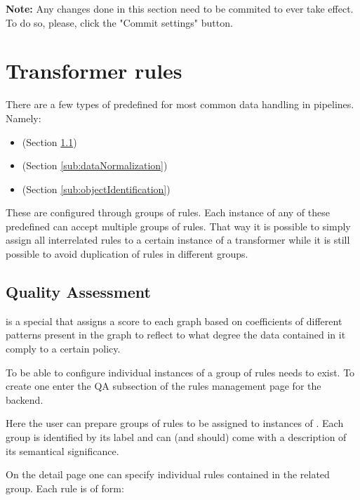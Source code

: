 	\textbf{Note:} Any changes done in this section need to be commited to ever take effect. To do so, please, click the "Commit settings" button.

\section{Transformer rules}
\label{sec:transformerRules}

	There are a few types of  predefined for most common data handling in pipelines. Namely:
	\begin{itemize}
		\item {}  (Section \ref{sub:qualityAssessment})
		\item {}   (Section \ref{sub:dataNormalization})
		\item {}  (Section \ref{sub:objectIdentification})
	\end{itemize}
	
	These  are configured through groups of rules. Each instance of any of these predefined  can accept multiple groups of rules. That way it is possible to simply assign all interrelated rules to a certain instance of a transformer while it is still possible to avoid duplication of rules in different groups.

\subsection{Quality Assessment}
\label{sub:qualityAssessment}

 is a special  that assigns a score to each graph based on coefficients of different patterns present in the graph to reflect to what degree the data contained in it comply to a certain policy.

To be able to configure individual instances of  a group of rules needs to exist. To create one enter the QA subsection of the rules management page for the backend.

Here the user can prepare groups of rules to be assigned to instances of . Each group is identified by its label and can (and should) come with a description of its semantical significance.

On the detail page one can specify individual rules contained in the related group. Each rule is of form:

